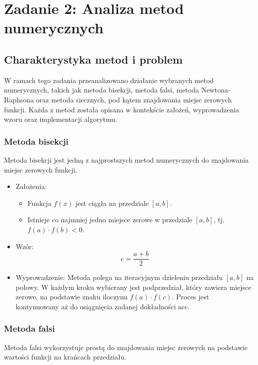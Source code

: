 \section{Zadanie 2: Analiza metod numerycznych}

\subsection{Charakterystyka metod i problem}
W ramach tego zadania przeanalizowano działanie wybranych metod numerycznych, takich jak metoda bisekcji, metoda falsi, metoda Newtona-Raphsona oraz metoda siecznych, pod kątem znajdowania miejsc zerowych funkcji. Każda z metod została opisana w kontekście założeń, wyprowadzenia wzoru oraz implementacji algorytmu.

\subsubsection{Metoda bisekcji}
Metoda bisekcji jest jedną z najprostszych metod numerycznych do znajdowania miejsc zerowych funkcji.

\begin{itemize}
    \item Założenia:
    \begin{itemize}
        \item Funkcja \( f(x) \) jest ciągła na przedziale \([a, b]\).
        \item Istnieje co najmniej jedno miejsce zerowe w przedziale \([a, b]\), tj. \( f(a) \cdot f(b) < 0 \).
    \end{itemize}
    \item Wzór:
    \[ c = \frac{a + b}{2} \]
    \item Wyprowadzenie:
    Metoda polega na iteracyjnym dzieleniu przedziału \([a, b]\) na połowy. W każdym kroku wybierany jest podprzedział, który zawiera miejsce zerowe, na podstawie znaku iloczynu \( f(a) \cdot f(c) \). Proces jest kontynuowany aż do osiągnięcia zadanej dokładności \( \text{acc} \).
\end{itemize}

\subsubsection{Metoda falsi}
Metoda falsi wykorzystuje prostą do znajdowania miejsc zerowych na podstawie wartości funkcji na krańcach przedziału.

